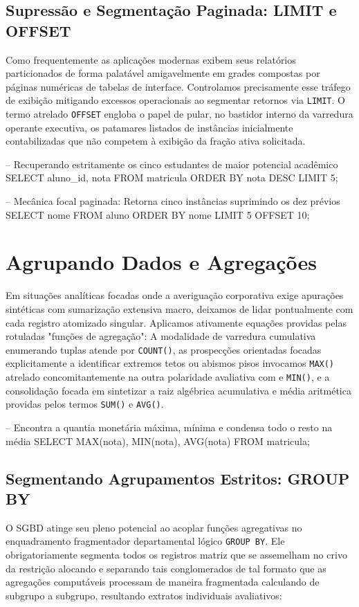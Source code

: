 \subsection{Supressão e Segmentação Paginada: LIMIT e OFFSET}
Como frequentemente as aplicações modernas exibem seus relatórios particionados de forma palatável amigavelmente em grades compostas por páginas numéricas de tabelas de interface. Controlamos precisamente esse tráfego de exibição mitigando excessos operacionais ao segmentar retornos via \texttt{LIMIT}. O termo atrelado \texttt{OFFSET} engloba o papel de pular, no bastidor interno da varredura operante executiva, os patamares listados de instâncias inicialmente contabilizadas que não competem à exibição da fração ativa solicitada.

\begin{sqlcode}
-- Recuperando estritamente os cinco estudantes de maior potencial acadêmico 
SELECT aluno_id, nota FROM matricula ORDER BY nota DESC LIMIT 5;

-- Mecânica focal paginada: Retorna cinco instâncias suprimindo os dez prévios 
SELECT nome FROM aluno ORDER BY nome LIMIT 5 OFFSET 10;
\end{sqlcode}

\section{Agrupando Dados e Agregações}

Em situações analíticas focadas onde a averiguação corporativa exige apurações sintéticas com sumarização extensiva macro, deixamos de lidar pontualmente com cada registro atomizado singular. Aplicamos ativamente equações providas pelas rotuladas "funções de agregação": 
A modalidade de varredura cumulativa enumerando tuplas atende por \texttt{COUNT()}, as prospecções orientadas focadas explicitamente a identificar extremos tetos ou abismos pisos invocamos \texttt{MAX()} atrelado concomitantemente na outra polaridade avaliativa com e \texttt{MIN()}, e a consolidação focada em sintetizar a raiz algébrica acumulativa e média aritmética providas pelos termos \texttt{SUM()} e \texttt{AVG()}.

\begin{sqlcode}
-- Encontra a quantia monetária máxima, mínima e condensa todo o resto na média
SELECT MAX(nota), MIN(nota), AVG(nota) FROM matricula;
\end{sqlcode}

\subsection{Segmentando Agrupamentos Estritos: GROUP BY}
O SGBD atinge seu pleno potencial ao acoplar funções agregativas no enquadramento fragmentador departamental lógico \texttt{GROUP BY}. Ele obrigatoriamente segmenta todos os registros matriz que se assemelham no crivo da restrição alocando e separando tais conglomerados de tal formato que as agregações computáveis processam de maneira fragmentada calculando de subgrupo a subgrupo, resultando extratos individuais avaliativos:

